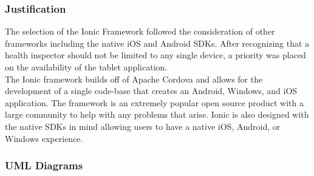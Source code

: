 \documentclass[twoside,letterpaper]{article}
\begin{document}
\subsubsection{Justification}
The selection of the Ionic Framework followed the consideration of other frameworks including the native iOS and Android SDKs. After recognizing that a health inspector should not be limited to any single device, a priority was placed on the availability of the tablet application. 
\\
The Ionic framework builds off of Apache Cordova and allows for the development of a single code-base that creates an Android, Windows, and iOS application. The framework is an extremely popular open source product with a large community to help with any problems that arise. Ionic is also designed with the native SDKs in mind allowing users to have a native iOS, Android, or Windows experience.

\newpage
\subsubsection{UML Diagrams}
\end{document}

